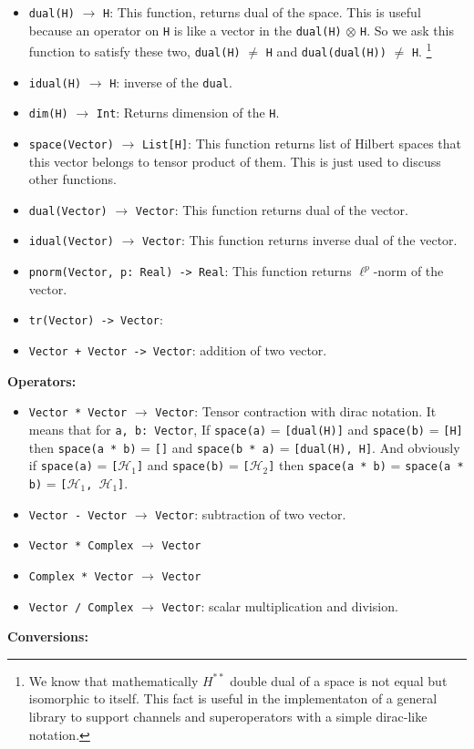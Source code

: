 \documentclass[a4paper,11pt]{article}
\def\co{\lstinline}
\begin{document}
\begin{itemize}
	\item \co|dual(H)| \(\to\) \co|H|:
	    This function, returns dual of the space. This is useful because an operator on \co|H| is like a vector in the \co|dual(H)| \(\otimes\) \co|H|. So we ask this function to satisfy these two, \co|dual(H)| \(\ne\) \co|H| and \co|dual(dual(H))| \(\ne\) \co|H|.%
	    \footnote{We know that mathematically \(H^{**}\) double dual of a space is not equal but isomorphic to itself.
            This fact is useful in the implementaton of a general library to support channels and superoperators with a simple dirac-like notation.}
    \item \co|idual(H)| \(\to\) \co|H|:
        inverse of the \co|dual|.
    \item \co|dim(H)| \(\to\) \co|Int|:
        Returns dimension of the \co|H|.
    \item \co|space(Vector)| \(\to\) \co|List[H]|:
        This function returns list of Hilbert spaces that this vector belongs to tensor product of them.
        This is just used to discuss other functions. 
	\item \co|dual(Vector)| \(\to\) \co|Vector|:
	    This function returns dual of the vector.
	\item \co|idual(Vector)| \(\to\) \co|Vector|:
	    This function returns inverse dual of the vector.
	\item \co|pnorm(Vector, p: Real) -> Real|:
	    This function returns $\ell^p$-norm of the vector.
	\item \co|tr(Vector) -> Vector|:
	    \item \co|Vector + Vector -> Vector|: addition of two vector.
    
\end{itemize}
\textbf{Operators: }
\begin{itemize}
    \item \co|Vector * Vector| \(\to\) \co|Vector|: 
	    Tensor contraction with dirac notation. It means that for \co|a, b: Vector|, 
	    If \co|space(a)| = \co|[dual(H)]| and \co|space(b)| = \co|[H]| then \co|space(a * b)| = \co|[]| and \co|space(b * a)| = \co|[dual(H), H]|. And obviously if \co|space(a)| = \co|[|\(\mathcal{H}_1\)\co|]|  and \co|space(b)| = \co|[|\(\mathcal{H}_2\)\co|]|
	    then \co|space(a * b)| = \co|space(a * b)| = \co|[|\(\mathcal{H}_1\)\co|, |\(\mathcal{H}_1\)\co|]|.
	\item \co|Vector - Vector| \(\to\) \co|Vector|: subtraction of two vector.  
    \item \co|Vector * Complex| \(\to\) \co|Vector|
    \item \co|Complex * Vector| \(\to\) \co|Vector|
    \item \co|Vector / Complex| \(\to\) \co|Vector|: scalar multiplication and division.
    
\end{itemize}
\textbf{Conversions: }
\end{document}
